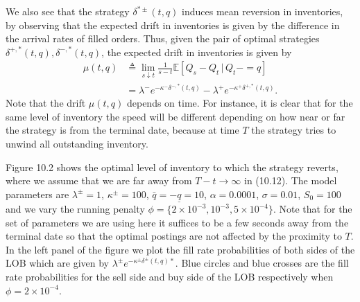 \documentclass[11pt, a4paper]{book}
\newcommand{\E}{\mathbb{E}}
\begin{document}
	We also see that the strategy $\delta^{*\pm}(t, q)$ induces mean reversion in inventories, by observing that the expected drift in inventories is given by the difference in the arrival rates of filled orders. Thus, given the pair of optimal strategies $\delta^{+, *}(t, q), \delta^{-, *}(t, q)$, the expected drift in inventories is given by
	\begin{equation}
		\begin{aligned}
			\mu(t, q) &\triangleq \lim_{s \downarrow t} \frac{1}{s-t} \E \left[ Q_s - Q_t \,|\, Q_t- = q \right] \\
			&= \lambda^- e^{-\kappa^- \delta^{-, *}(t,q)} - \lambda^+ e^{-\kappa^+ \delta^{+, *}(t,q)}.
		\end{aligned} \label{eq:10.12}
	\end{equation}
	Note that the drift $\mu(t, q)$ depends on time. For instance, it is clear that for the same level of inventory the speed will be different depending on how near or far the strategy is from the terminal date, because at time $T$ the strategy tries to unwind all outstanding inventory.
	
	Figure 10.2 shows the optimal level of inventory to which the strategy reverts, where we assume that we are far away from $T-t \to \infty$ in (10.12). The model parameters are $\lambda^\pm = 1$, $\kappa^\pm = 100$, $\bar{q} = -\underline{q} = 10$, $\alpha = 0.0001$, $\sigma = 0.01$, $S_0 = 100$ and we vary the running penalty $\phi = \{2 \times 10^{-3}, 10^{-3}, 5 \times 10^{-4}\}$. Note that for the set of parameters we are using here it suffices to be a few seconds away from the terminal date so that the optimal postings are not affected by the proximity to $T$. In the left panel of the figure we plot the fill rate probabilities of both sides of the LOB which are given by $\lambda^\pm e^{-\kappa^\pm \delta^{\pm}(t,q)*}$. Blue circles and blue crosses are the fill rate probabilities for the sell side and buy side of the LOB respectively when $\phi = 2 \times 10^{-4}$.
	
\end{document}

